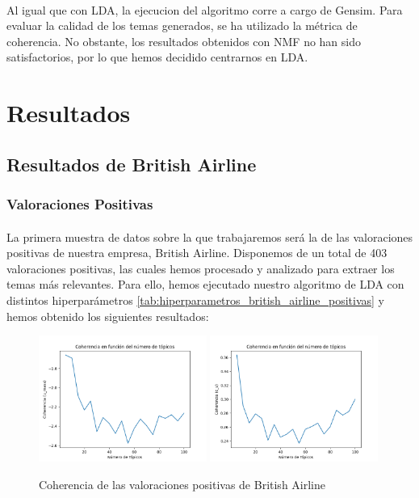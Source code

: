 \documentclass{report}
\begin{document}
                \paragraph*{}{
                    Al igual que con LDA, la ejecucion del algoritmo corre a cargo de Gensim.
                    Para evaluar la calidad de los temas generados, se ha utilizado la métrica de coherencia.
                    No obstante, los resultados obtenidos con NMF no han sido satisfactorios, por lo que hemos decidido centrarnos en LDA.
                }
        \clearpage\section{Resultados}
            \subsection{Resultados de British Airline}
                \subsubsection*{Valoraciones Positivas}
                    \paragraph*{}{
                        La primera muestra de datos sobre la que trabajaremos será la de las valoraciones positivas de nuestra empresa, British Airline.
                        Disponemos de un total de 403 valoraciones positivas, las cuales hemos procesado y analizado para extraer los temas más relevantes.
                        Para ello, hemos ejecutado nuestro algoritmo de LDA con distintos hiperparámetros \ref{tab:hiperparametros_british_airline_positivas} y hemos obtenido los siguientes resultados: 
                    }
                    \begin{figure}[H]
                        \centering
                        \includegraphics[width=0.49\textwidth]{./img/british_airline_positivas_umass.png}
                        \includegraphics[width=0.49\textwidth]{./img/british_airline_positivas_cv.png}
                        \caption{Coherencia de las valoraciones positivas de British Airline}
                    \end{figure}
\end{document}
